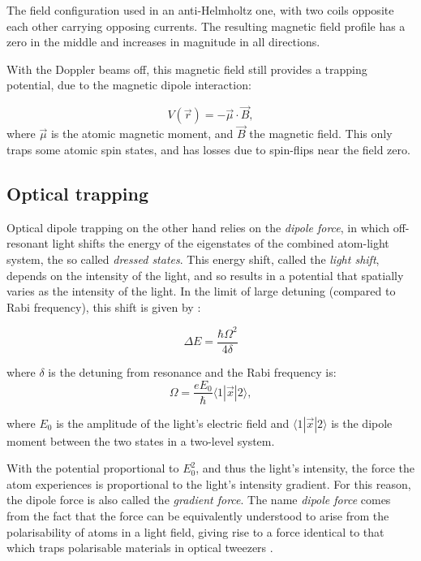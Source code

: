 The field configuration used in an anti-Helmholtz one, with two coils opposite each other carrying opposing currents. The resulting magnetic field profile has a zero in the middle and increases in magnitude in all directions.

With the Doppler beams off, this magnetic field still provides a trapping potential, due to the magnetic dipole interaction:

\begin{equation}
V(\vec{r}) = -\vec \mu \cdot \vec B,
\end{equation}
where $\vec\mu$ is the atomic magnetic moment, and $\vec B$ the magnetic field. This only traps some atomic spin states, and has losses due to spin-flips \cite{brink_majorana_2006} near the field zero.

\subsection{Optical trapping}

Optical dipole trapping on the other hand relies on the \emph{dipole force}, in which off-resonant light shifts the energy of the eigenstates of the combined atom-light system, the so called \emph{dressed states}. This energy shift, called the \emph{light shift}, depends on the intensity of the light, and so results in a potential that spatially varies as the intensity of the light. In the limit of large detuning (compared to Rabi frequency), this shift is given by \cite[p 8]{metcalf_laser_1999}:

\begin{equation}
\Delta E = \frac{\hbar\Omega^2}{4\delta}
\end{equation}

where $\delta$ is the detuning from resonance and the Rabi frequency is:
\begin{equation}
\Omega=\frac{eE_0}\hbar\langle1|\vec{x}|2\rangle,
\end{equation}

where $E_0$ is the amplitude of the light's electric field and  $\langle1|\vec{x}|2\rangle$ is the dipole moment between the two states in a two-level system.

With the potential proportional to $E_0^2$, and thus the light's intensity, the force the atom experiences is proportional to the light's intensity gradient. For this reason, the dipole force is also called the \emph{gradient force}. The name \emph{dipole force} comes from the fact that the force can be equivalently understood to arise from the polarisability of atoms in a light field, giving rise to a force identical to that which traps polarisable materials in optical tweezers \cite{ashkin_acceleration_1970}.

